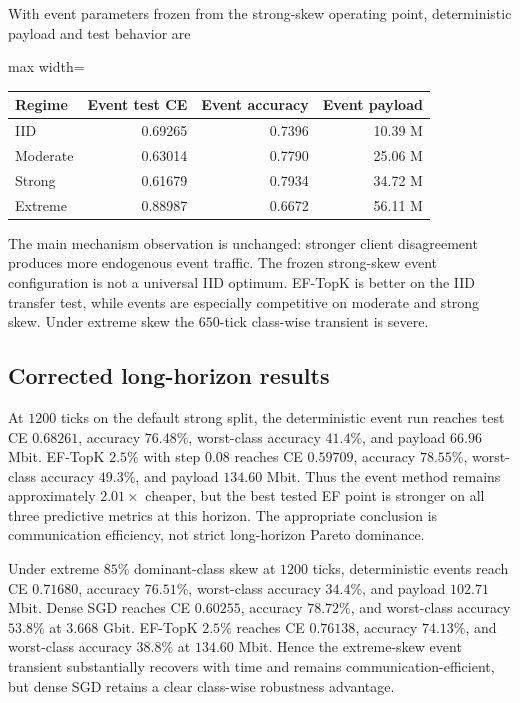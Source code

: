 With event parameters frozen from the strong-skew operating point, deterministic payload and test behavior are
\begin{center}
\begin{adjustbox}{max width=\textwidth}
\begin{tabular}{lrrr}
\toprule
Regime & Event test CE & Event accuracy & Event payload\\
\midrule
IID & 0.69265 & 0.7396 & 10.39 M\\
Moderate & 0.63014 & 0.7790 & 25.06 M\\
Strong & 0.61679 & 0.7934 & 34.72 M\\
Extreme & 0.88987 & 0.6672 & 56.11 M\\
\bottomrule
\end{tabular}
\end{adjustbox}
\end{center}
The main mechanism observation is unchanged: stronger client disagreement produces more endogenous event traffic. The frozen strong-skew event configuration is not a universal IID optimum. EF-TopK is better on the IID transfer test, while events are especially competitive on moderate and strong skew. Under extreme skew the $650$-tick class-wise transient is severe.

\subsection{Corrected long-horizon results}

At $1200$ ticks on the default strong split, the deterministic event run reaches test CE $0.68261$, accuracy $76.48\%$, worst-class accuracy $41.4\%$, and payload $66.96$ Mbit. EF-TopK $2.5\%$ with step $0.08$ reaches CE $0.59709$, accuracy $78.55\%$, worst-class accuracy $49.3\%$, and payload $134.60$ Mbit. Thus the event method remains approximately $2.01\times$ cheaper, but the best tested EF point is stronger on all three predictive metrics at this horizon. The appropriate conclusion is communication efficiency, not strict long-horizon Pareto dominance.

Under extreme $85\%$ dominant-class skew at $1200$ ticks, deterministic events reach CE $0.71680$, accuracy $76.51\%$, worst-class accuracy $34.4\%$, and payload $102.71$ Mbit. Dense SGD reaches CE $0.60255$, accuracy $78.72\%$, and worst-class accuracy $53.8\%$ at $3.668$ Gbit. EF-TopK $2.5\%$ reaches CE $0.76138$, accuracy $74.13\%$, and worst-class accuracy $38.8\%$ at $134.60$ Mbit. Hence the extreme-skew event transient substantially recovers with time and remains communication-efficient, but dense SGD retains a clear class-wise robustness advantage.

